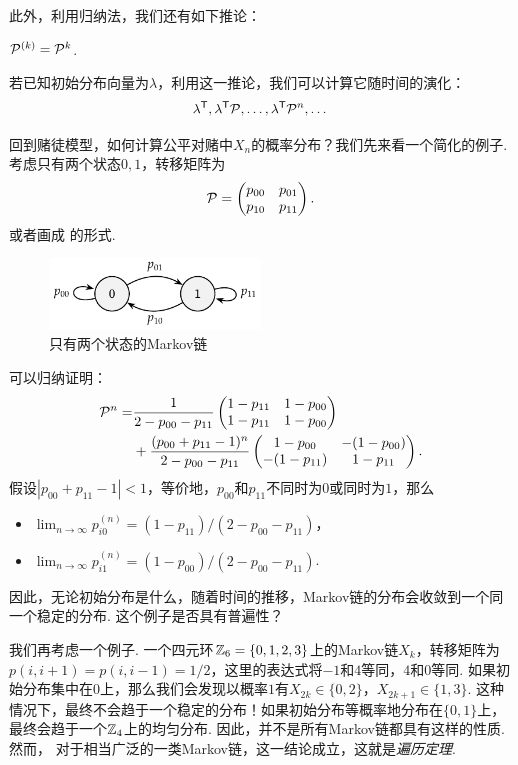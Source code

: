 此外，利用归纳法，我们还有如下推论：
\begin{corollary}\label{cor:kolmogorov-chapman}
    $\mathcal P^{(k)}=\mathcal P^k$.    
\end{corollary}

若已知初始分布向量为$\lambda$，利用这一推论，我们可以计算它随时间的演化：
	\[\lambda^{\mathsf{T}},\lambda^{\mathsf{T}} \mathcal P,\dots,\lambda^{\mathsf{T}} \mathcal P^n,\dots\] %

回到赌徒模型，如何计算公平对赌中$X_n$的概率分布？我们先来看一个简化的例子. 考虑只有两个状态$0,1$，转移矩阵为
	\[\mathcal P=\begin{pmatrix}p_{00}&p_{01}\\p_{10}&p_{11}
	\end{pmatrix}.\]
或者画成 的形式.
\begin{figure}
    \centering
    \includegraphics[width=0.5\textwidth]{figures/Markov-chain/simple-example.pdf}
    \caption{只有两个状态的Markov链}
    \label{fig:simple-example}
\end{figure}

可以归纳证明：
\begin{align*}
    \mathcal P^n=&\frac{1}{2-p_{00}-p_{11}}\begin{pmatrix}1-p_{11}&1-p_{00}\\1-p_{11}&1-p_{00}\end{pmatrix}\\
    &+\frac{(p_{00}+p_{11}-1)^n}{2-p_{00}-p_{11}}\begin{pmatrix}1-p_{00}&-(1-p_{00})\\-(1-p_{11})&1-p_{11}\end{pmatrix}.
\end{align*}
假设$|p_{00}+p_{11}-1|<1$，等价地，$p_{00}$和$p_{11}$不同时为$0$或同时为$1$，那么
    \begin{itemize}
        \item $\lim_{n\to\infty}p_{i0}^{(n)}=(1-p_{11})/(2-p_{00}-p_{11})$，
        \item $\lim_{n\to\infty}p_{i1}^{(n)}=(1-p_{00})/(2-p_{00}-p_{11})$.
    \end{itemize}
因此，无论初始分布是什么，随着时间的推移，Markov链的分布会收敛到一个同一个稳定的分布. 这个例子是否具有普遍性？

我们再考虑一个例子. 一个四元环$\mathbb{Z}_6=\{0,1,2,3\}$上的Markov链$X_k$，转移矩阵为$p(i,i+1)=p(i,i-1)=1/2$，这里的表达式将$-1$和$4$等同，$4$和$0$等同. 如果初始分布集中在$0$上，那么我们会发现以概率$1$有$X_{2k}\in\{0,2\}$，$X_{2k+1}\in\{1,3\}$. 这种情况下，最终不会趋于一个稳定的分布！如果初始分布等概率地分布在$\{0,1\}$上，最终会趋于一个$\mathbb{Z}_4$上的均匀分布. 因此，并不是所有Markov链都具有这样的性质. 然而， 对于相当广泛的一类Markov链，这一结论成立，这就是\emph{遍历定理}.

